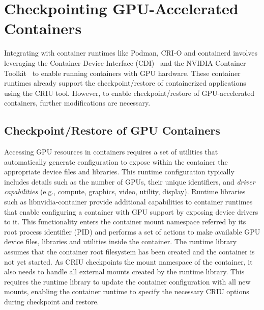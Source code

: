 \section{Checkpointing GPU-Accelerated Containers}\label{sec:implementation}%
%
Integrating \sys with container runtimes like Podman, CRI-O and containerd involves leveraging the Container Device Interface (CDI)~\cite{cdi} and the NVIDIA Container Toolkit~\cite{container-toolkit} to enable running containers with GPU hardware. These container runtimes already support the checkpoint/restore of containerized applications using the CRIU tool. However, to enable checkpoint/restore of GPU-accelerated containers, further modifications are necessary.

\subsection{Checkpoint/Restore of GPU Containers}
Accessing GPU resources in containers requires a set of utilities that automatically generate configuration to expose within the container the appropriate device files and libraries. This runtime configuration typically includes details such as the number of GPUs, their unique identifiers, and \textit{driver capabilities} (e.g., compute, graphics, video, utility, display). Runtime libraries such as libnvidia-container provide additional capabilities to container runtimes that enable configuring a container with GPU support by exposing device drivers to it. This functionality enters the container mount namespace referred by its root process identifier (PID) and performs a set of actions to make available GPU device files, libraries and utilities inside the container. The runtime library assumes that the container root filesystem has been created and the container is not yet started. As CRIU checkpoints the mount namespace of the container, it also needs to handle all external mounts created by the runtime library. This requires the runtime library to update the container configuration with all new mounts, enabling the container runtime to specify the necessary CRIU options during checkpoint and restore.

